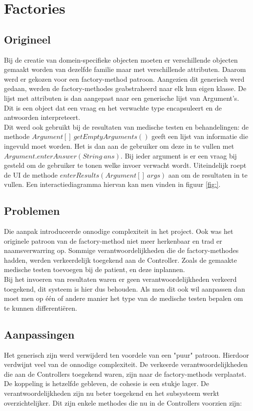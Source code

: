 \section{Factories\label{Factory}}
\subsection{Origineel}
Bij de creatie van domein-specifieke objecten moeten er verschillende objecten gemaakt worden van dezelfde familie maar met verschillende attributen. 
Daarom werd er gekozen voor een factory-method patroon. 
Aangezien dit generisch werd gedaan, werden de factory-methodes geabstraheerd naar elk hun eigen klasse. 
De lijst met attributen is dan aangepast naar een generische lijst van Argument's. 
Dit is een object dat een vraag en het verwachte type encapsuleert en de antwoorden interpreteert.\\

Dit werd ook gebruikt bij de resultaten van medische testen en behandelingen: 
de methode $Argument[]\ getEmptyArguments()$ geeft een lijst van informatie die ingevuld moet worden.
Het is dan aan de gebruiker om deze in te vullen met $Argument.enterAnswer(String\ ans)$. 
Bij ieder argument is er een vraag bij gesteld om de gebruiker te tonen welke invoer verwacht wordt. 
Uiteindelijk roept de UI de methode $enterResults(Argument[]\ args)$ aan om de resultaten in te vullen. 
Een interactiediagramma hiervan kan men vinden in figuur \ref{fig:}.


\subsection{Problemen}
Die aanpak introduceerde onnodige complexiteit in het project. 
Ook was het originele patroon van de factory-method niet meer herkenbaar en trad er naamsverwarring op. 
Sommige verantwoordelijkheden die de factory-methodes hadden, werden verkeerdelijk toegekend aan de Controller. 
Zoals de gemaakte medische testen toevoegen bij de patient, en deze inplannen. \\

Bij het invoeren van resultaten waren er geen verantwoordelijkheden verkeerd toegekend, dit systeem is hier dus behouden. 
Als men dit ook wil aanpassen dan moet men op één of andere manier het type van de medische testen bepalen om te kunnen differentiëren. 

\subsection{Aanpassingen}
Het generisch zijn werd verwijderd ten voordele van een "puur" patroon. 
Hierdoor verdwijnt veel van de onnodige complexiteit.
De verkeerde verantwoordelijkheden die aan de Controllers toegekend waren, zijn naar de factory-methods verplaatst.
De koppeling is hetzelfde gebleven, de cohesie is een stukje lager. 
De verantwoordelijkheden zijn nu beter toegekend en het subsysteem werkt overzichtelijker. 
Dit zijn enkele methodes die nu in de Controllers voorzien zijn:

